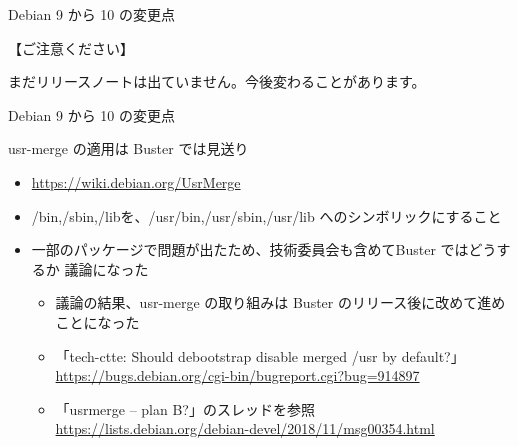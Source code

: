 \begin{frame}{Debian 9 から 10 の変更点}%

【ご注意ください】

まだリリースノートは出ていません。今後変わることがあります。

\end{frame}



\begin{frame}{Debian 9 から 10 の変更点}%

usr-merge の適用は Buster では見送り

\begin{itemize}
\item \url{https://wiki.debian.org/UsrMerge}
\item /bin,/sbin,/libを、/usr/bin,/usr/sbin,/usr/lib へのシンボリックにすること
\item 一部のパッケージで問題が出たため、技術委員会も含めてBuster ではどうするか 議論になった
  \begin{itemize}
  \item 議論の結果、usr-merge の取り組みは Buster のリリース後に改めて進めことになった
  \item 「tech-ctte: Should debootstrap disable merged /usr by default?」 \url{https://bugs.debian.org/cgi-bin/bugreport.cgi?bug=914897}
  \item 「usrmerge -- plan B?」のスレッドを参照 \url{https://lists.debian.org/debian-devel/2018/11/msg00354.html}
  \end{itemize}
\end{itemize}

\end{frame}


%
%  
%    



